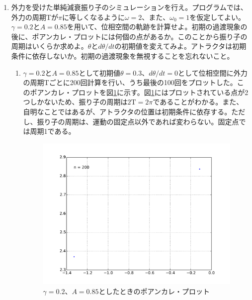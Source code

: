 \documentclass{jsarticle}
\begin{document}
        \begin{enumerate}
            \renewcommand{\labelenumi}{\alph{enumi}.}
            \renewcommand{\labelenumii}{}
            
            \item  外力を受けた単純減衰振り子のシミュレーションを行え。プログラムでは、外力の周期Tが$\pi$に等しくなるように$\omega=2$、また、$\omega_{0}=1$を仮定してよい。$\gamma=0.2$と$A=0.85$を用いて、位相空間の軌跡を計算せよ。初期の過渡現象の後に、ポアンカレ・プロットには何個の点があるか。このことから振り子の周期はいくらか求めよ。$\theta$と$d\theta /dt$の初期値を変えてみよ。アトラクタは初期条件に依存しないか。初期の過渡現象を無視することを忘れないこと。
            
                \begin{enumerate}
                    \item $\gamma=0.2$と$A=0.85$として初期値$\theta=0.3$、$d\theta /dt=0$として位相空間に外力の周期Tごとに200回計算を行い、うち最後の100回をプロットした。このポアンカレ・プロットを図\ref{fig:f1}に示す。図\ref{fig:f1}にはプロットされている点が2つしかないため、振り子の周期は$2\mathrm{T}=2\pi$であることがわかる。また、自明なことではあるが、アトラクタの位置は初期条件に依存する。ただし、振り子の周期は、運動の固定点以外であれば変わらない。固定点では周期1である。
                    \begin{figure}[H]
                        \begin{center}
                        \includegraphics[width=12.5cm]{figure_1.pdf}
                        \caption{$\gamma=0.2$、$A=0.85$としたときのポアンカレ・プロット}
                        \label{fig:f1}
                        \end{center}
                    \end{figure}                    
                \end{enumerate}    
            

\end{enumerate}
\end{document}
